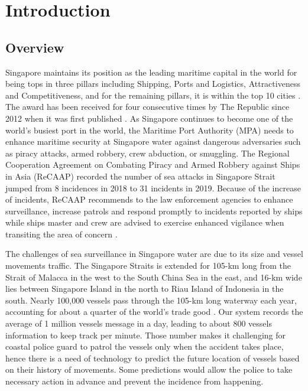 
\chapter{Introduction}
\vspace{2em}

\section{Overview}

Singapore maintains its position as the leading maritime capital in the world for being tops in three pillars including Shipping, Ports and Logistics, Attractiveness and Competitiveness, and for the remaining pillars, it is within the top 10 cities \cite{dnvgl2019maritime}. The award has been received for four consecutive times by The Republic since 2012 when it was first published \cite{straittimes2019maritime}. As Singapore continues to become one of the world's busiest port in the world, the Maritime Port Authority (MPA) needs to enhance maritime security at Singapore water against dangerous adversaries such as piracy attacks, armed robbery, crew abduction, or smuggling. The Regional Cooperation Agreement on Combating Piracy and Armed Robbery against Ships in Asia (ReCAAP) recorded the number of sea attacks in Singapore Strait jumped from 8 incidences in 2018 to 31 incidents in 2019. Because of the increase of incidents, ReCAAP recommends to the law enforcement agencies to enhance surveillance, increase patrols and respond promptly to incidents reported by ships while ships master and crew are advised to exercise enhanced vigilance when transiting the area of concern \cite{recaap2019report}.

The challenges of sea surveillance in Singapore water are due to its size and vessel movements traffic. The Singapore Straits is extended for 105-km long from the Strait of Malacca in the west to the South China Sea in the east, and 16-km wide lies between Singapore Island in the north to Riau Island of Indonesia in the south. Nearly 100,000 vessels pass through the 105-km long waterway each year, accounting for about a quarter of the world's trade good \cite{scmp2019maritime}. Our system records the average of 1 million vessels message in a day, leading to about 800 vessels information to keep track per minute. Those number makes it challenging for coastal police guard to patrol the vessels only when the accident takes place, hence there is a need of technology to predict the future location of vessels based on their history of movements. Some predictions would allow the police to take necessary action in advance and prevent the incidence from happening.


